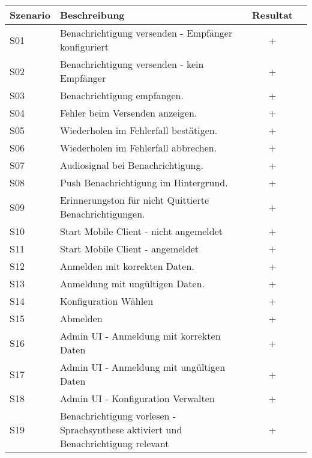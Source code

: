 \begin{table}[h]
    \centering
    \begin{tabular}{|l|p{11cm}|c|c|}
        \hline
        \textbf{Szenario} & \textbf{Beschreibung} & \textbf{Resultat} \\
        \hline
        S01         & Benachrichtigung versenden - Empfänger konfiguriert   & +\\
        \hline
        S02         & Benachrichtigung versenden - kein Empfänger & +\\
        \hline
        S03         & Benachrichtigung empfangen.  & +\\
        \hline
        S04         & Fehler beim Versenden anzeigen.  & +\\
        \hline
        S05         & Wiederholen im Fehlerfall bestätigen.  & +\\
        \hline
        S06         & Wiederholen im Fehlerfall abbrechen.  & +\\
        \hline
        S07         & Audiosignal bei Benachrichtigung.   & +\\
        \hline
        S08         & Push Benachrichtigung im Hintergrund.  & +\\
        \hline
        S09         & Erinnerungston für nicht Quittierte Benachrichtigungen.   & +\\
        \hline
        S10         & Start Mobile Client - nicht angemeldet   & +\\
        \hline
        S11         & Start Mobile Client  - angemeldet & +\\
        \hline
        S12         & Anmelden mit korrekten Daten.   & +\\
        \hline
        S13         & Anmeldung mit ungültigen Daten.   & +\\
        \hline
        S14         & Konfiguration Wählen   & +\\
        \hline
        S15         & Abmelden   & +\\
        \hline
        S16         & Admin UI - Anmeldung mit korrekten Daten   & +\\
        \hline
        S17         & Admin UI - Anmeldung mit ungültigen Daten   & +\\
        \hline
        S18         & Admin UI - Konfiguration Verwalten   & +\\
        \hline
        S19         & Benachrichtigung vorlesen - Sprachsynthese aktiviert und Benachrichtigung relevant & +\\

\end{tabular}
\end{table}
